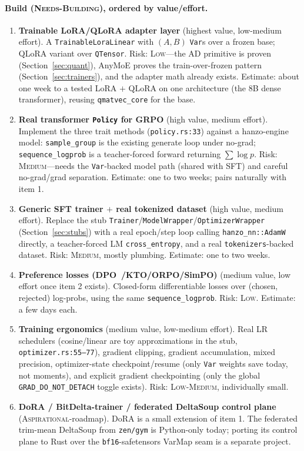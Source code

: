 \documentclass[11pt]{article}
\begin{document}
\paragraph{Build (\textsc{Needs-Building}), ordered by value/effort.}
\begin{enumerate}
    \item \textbf{Trainable LoRA/QLoRA adapter layer} (highest value, low-medium effort). A \texttt{TrainableLoraLinear} with $(A,B)$ \texttt{Var}s over a frozen base; QLoRA variant over \texttt{QTensor}. Risk: \textsc{Low}---the AD primitive is proven (Section~\ref{sec:quant}), AnyMoE proves the train-over-frozen pattern (Section~\ref{sec:trainers}), and the adapter math already exists. Estimate: about one week to a tested LoRA $+$ QLoRA on one architecture (the 8B dense transformer), reusing \texttt{qmatvec\_core} for the base.
    \item \textbf{Real transformer \texttt{Policy} for GRPO} (high value, medium effort). Implement the three trait methods (\texttt{policy.rs:33}) against a hanzo-engine model: \texttt{sample\_group} is the existing generate loop under no-grad; \texttt{sequence\_logprob} is a teacher-forced forward returning $\sum \log p$. Risk: \textsc{Medium}---needs the \texttt{Var}-backed model path (shared with SFT) and careful no-grad/grad separation. Estimate: one to two weeks; pairs naturally with item 1.
    \item \textbf{Generic SFT trainer $+$ real tokenized dataset} (high value, medium effort). Replace the stub \texttt{Trainer}/\texttt{ModelWrapper}/\texttt{OptimizerWrapper} (Section~\ref{sec:stubs}) with a real epoch/step loop calling \texttt{hanzo\_nn::AdamW} directly, a teacher-forced LM \texttt{cross\_entropy}, and a real \texttt{tokenizers}-backed dataset. Risk: \textsc{Medium}, mostly plumbing. Estimate: one to two weeks.
    \item \textbf{Preference losses (DPO~\cite{rafailov2023dpo}/KTO/ORPO/SimPO)} (medium value, low effort once item 2 exists). Closed-form differentiable losses over (chosen, rejected) log-probs, using the same \texttt{sequence\_logprob}. Risk: \textsc{Low}. Estimate: a few days each.
    \item \textbf{Training ergonomics} (medium value, low-medium effort). Real LR schedulers (cosine/linear are toy approximations in the stub, \texttt{optimizer.rs:55--77}), gradient clipping, gradient accumulation, mixed precision, optimizer-state checkpoint/resume (only \texttt{Var} weights save today, not moments), and explicit gradient checkpointing (only the global \texttt{GRAD\_DO\_NOT\_DETACH} toggle exists). Risk: \textsc{Low-Medium}, individually small.
    \item \textbf{DoRA / BitDelta-trainer / federated DeltaSoup control plane} (\textsc{Aspirational}-roadmap). DoRA is a small extension of item 1. The federated trim-mean DeltaSoup from \texttt{zen/gym} is Python-only today; porting its control plane to Rust over the \texttt{bf16}-safetensors VarMap seam is a separate project.
\end{enumerate}
\end{document}

